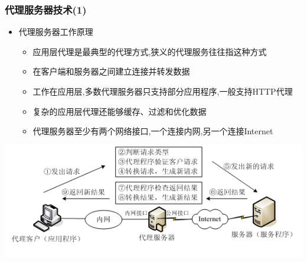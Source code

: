 \documentclass[xcolor=svgnames,presentation]{beamer}
\begin{document}
\begin{frame}
\frametitle{代理服务器技术(1)}
\label{sec-1-11}
\begin{itemize}

\item 代理服务器工作原理
\label{sec-1-11-1}%
\begin{itemize}

\item 应用层代理是最典型的代理方式,狭义的代理服务往往指这种方式
\label{sec-1-11-1-1}%

\item 在客户端和服务器之间建立连接并转发数据
\label{sec-1-11-1-2}%

\item 工作在应用层,多数代理服务器只支持部分应用程序,一般支持HTTP代理
\label{sec-1-11-1-3}%

\item 复杂的应用层代理还能够缓存、过滤和优化数据
\label{sec-1-11-1-4}%

\item 代理服务器至少有两个网络接口,一个连接内网,另一个连接Internet
\label{sec-1-11-1-5}%
\end{itemize} %
\end{itemize} %
\label{sec-1-11-2}

\includegraphics[width=.9\linewidth]{img/agent1.png}
\end{frame}
\end{document}
